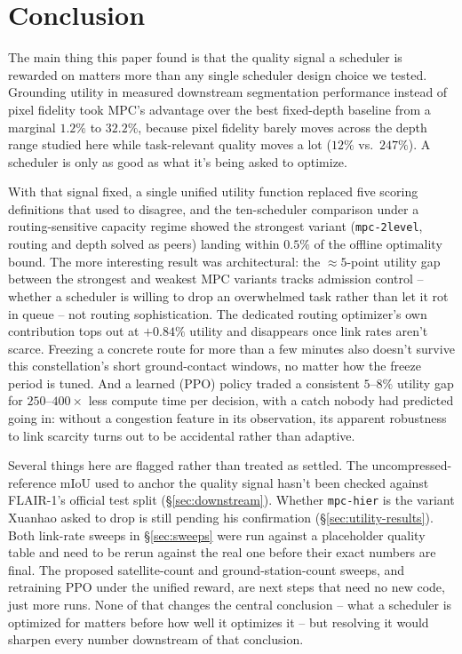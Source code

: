 \section{Conclusion}
\label{sec:conclusion}

The main thing this paper found is that the quality signal a scheduler is rewarded on matters more than any single scheduler design choice we tested. Grounding utility in measured downstream segmentation performance instead of pixel fidelity took MPC's advantage over the best fixed-depth baseline from a marginal $1.2\%$ to $32.2\%$, because pixel fidelity barely moves across the depth range studied here while task-relevant quality moves a lot ($12\%$ vs.\ $247\%$). A scheduler is only as good as what it's being asked to optimize.

With that signal fixed, a single unified utility function replaced five scoring definitions that used to disagree, and the ten-scheduler comparison under a routing-sensitive capacity regime showed the strongest variant (\texttt{mpc-2level}, routing and depth solved as peers) landing within $0.5\%$ of the offline optimality bound. The more interesting result was architectural: the $\approx 5$-point utility gap between the strongest and weakest MPC variants tracks admission control -- whether a scheduler is willing to drop an overwhelmed task rather than let it rot in queue -- not routing sophistication. The dedicated routing optimizer's own contribution tops out at $+0.84\%$ utility and disappears once link rates aren't scarce. Freezing a concrete route for more than a few minutes also doesn't survive this constellation's short ground-contact windows, no matter how the freeze period is tuned. And a learned (PPO) policy traded a consistent $5$--$8\%$ utility gap for $250$--$400\times$ less compute time per decision, with a catch nobody had predicted going in: without a congestion feature in its observation, its apparent robustness to link scarcity turns out to be accidental rather than adaptive.

Several things here are flagged rather than treated as settled. The uncompressed-reference mIoU used to anchor the quality signal hasn't been checked against FLAIR-1's official test split (\S\ref{sec:downstream}). Whether \texttt{mpc-hier} is the variant Xuanhao asked to drop is still pending his confirmation (\S\ref{sec:utility-results}). Both link-rate sweeps in \S\ref{sec:sweeps} were run against a placeholder quality table and need to be rerun against the real one before their exact numbers are final. The proposed satellite-count and ground-station-count sweeps, and retraining PPO under the unified reward, are next steps that need no new code, just more runs. None of that changes the central conclusion -- what a scheduler is optimized for matters before how well it optimizes it -- but resolving it would sharpen every number downstream of that conclusion.
